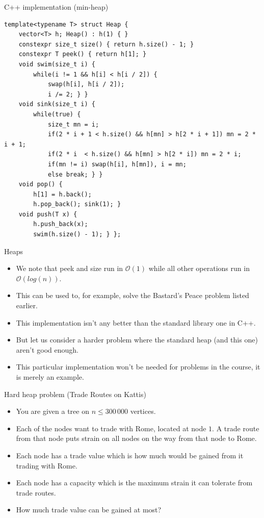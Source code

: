 \documentclass{beamer}
\begin{document}
\begin{frame}{C++ implementation (min-heap)}
    \scriptsize
    \begin{verbatim}
template<typename T> struct Heap {
    vector<T> h; Heap() : h(1) { }
    constexpr size_t size() { return h.size() - 1; }
    constexpr T peek() { return h[1]; }
    void swim(size_t i) {
        while(i != 1 && h[i] < h[i / 2]) {
            swap(h[i], h[i / 2]);
            i /= 2; } }
    void sink(size_t i) {
        while(true) {
            size_t mn = i;
            if(2 * i + 1 < h.size() && h[mn] > h[2 * i + 1]) mn = 2 * i + 1;
            if(2 * i  < h.size() && h[mn] > h[2 * i]) mn = 2 * i;
            if(mn != i) swap(h[i], h[mn]), i = mn;
            else break; } }
    void pop() {
        h[1] = h.back();
        h.pop_back(); sink(1); }
    void push(T x) {
        h.push_back(x);
        swim(h.size() - 1); } };
    \end{verbatim}
\end{frame}

\begin{frame}[plain]{Heaps}
    \begin{itemize}
        \item We note that peek and size run in $\mathcal{O}(1)$ while all other operations run in $\mathcal{O}(log(n))$.
        \item This can be used to, for example, solve the Bastard's Peace problem listed earlier.
        \item This implementation isn't any better than the standard library one in C++.
        \item But let us consider a harder problem where the standard heap (and this one) aren't good enough.
        \item This particular implementation won't be needed for problems in the course, it is merely an example.
    \end{itemize}
\end{frame}

\begin{frame}[plain]{Hard heap problem (Trade Routes on Kattis)}
    \begin{itemize}
        \item You are given a tree on $n \leq 300\,000$ vertices.
        \item Each of the nodes want to trade with Rome, located at node $1$. A trade route from that node puts strain on all nodes on the way from that node to Rome.
        \item Each node has a trade value which is how much would be gained from it trading with Rome.
        \item Each node has a capacity which is the maximum strain it can tolerate from trade routes.
        \item How much trade value can be gained at most?
    \end{itemize}
\end{frame}
\end{document}
